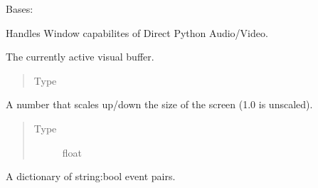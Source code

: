 \documentclass[letterpaper,10pt,english,openany,oneside]{sphinxmanual}
\begin{document}
\begin{fulllineitems}

\pysigstartsignatures
{}
\pysigstopsignatures
\sphinxAtStartPar
Bases: 

\sphinxAtStartPar
Handles Window capabilites of Direct Python Audio/Video.


\begin{fulllineitems}

\pysigstartsignatures
{}
\pysigstopsignatures
\sphinxAtStartPar
The currently active visual buffer.
\begin{quote}\begin{description}
\item[{Type}] \leavevmode
\sphinxAtStartPar
{}

\end{description}\end{quote}

\end{fulllineitems}



\begin{fulllineitems}

\pysigstartsignatures
{}
\pysigstopsignatures
\sphinxAtStartPar
A number that scales up/down the size of the screen (1.0 is unscaled).
\begin{quote}\begin{description}
\item[{Type}] \leavevmode
\sphinxAtStartPar
float

\end{description}\end{quote}

\end{fulllineitems}



\begin{fulllineitems}

\pysigstartsignatures
{}
\pysigstopsignatures
\sphinxAtStartPar
A dictionary of string:bool event pairs.


\end{fulllineitems}
\end{fulllineitems}
\end{document}
